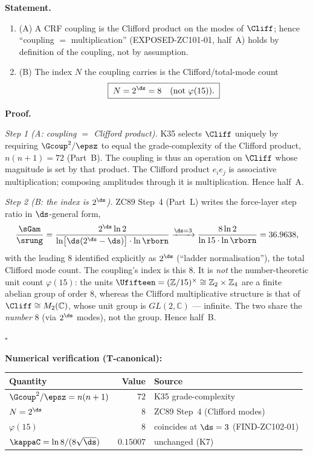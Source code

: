 \documentclass[12pt, a4paper]{article}
\begin{document}
\begin{formalbox}[title={THM-ZC102-01: The Coupling Is the Clifford Product, and Carries $2^{\ds}$ ($R_0$, Exact)}]

\textbf{Statement.}
\begin{enumerate}[leftmargin=2em, noitemsep]
  \item (A) A CRF coupling is the Clifford product on the modes of $\Cliff$;
    hence ``coupling $=$ multiplication'' (EXPOSED-ZC101-01, half~A) holds by
    definition of the coupling, not by assumption.
  \item (B) The index $N$ the coupling carries is the Clifford/total-mode count
    \begin{equation}
      \boxed{\;N = 2^{\ds} = 8 \quad(\text{not } \varphi(15)).\;}
      \label{eq:force-index-zc102}
    \end{equation}
\end{enumerate}

\textbf{Proof.}

\textit{Step 1 (A: coupling $=$ Clifford product).}
K35 selects $\Cliff$ uniquely by requiring $\Gcoup^2/\epsz$ to equal the
grade-complexity of the Clifford product, $n(n+1)=72$ (Part~B). The coupling is
thus an operation on $\Cliff$ whose magnitude is set by that product. The
Clifford product $e_ie_j$ is associative multiplication; composing amplitudes
through it is multiplication. Hence half~A.

\textit{Step 2 (B: the index is $2^{\ds}$).}
ZC89 Step~4 (Part~L) writes the force-layer step ratio in $\ds$-general form,
\[
  \frac{\sGam}{\srung}
   = \frac{2^{\ds}\ln 2}{\ln\!\big[\ds(2^{\ds}-\ds)\big]\cdot\ln\rborn}
   \xrightarrow{\ds=3}
   \frac{8\ln 2}{\ln 15\cdot\ln\rborn} = 36.9638,
\]
with the leading $8$ identified explicitly as $2^{\ds}$ (``ladder
normalisation''), the total Clifford mode count. The coupling's index is this
$8$. It is \emph{not} the number-theoretic unit count $\varphi(15)$: the units
$\Ufifteen=(\mathbb{Z}/15)^{\times}\cong\mathbb{Z}_2\times\mathbb{Z}_4$ are a
finite abelian group of order $8$, whereas the Clifford multiplicative structure
is that of $\Cliff\cong M_2(\mathbb{C})$, whose unit group is $GL(2,\mathbb{C})$
--- infinite. The two share the \emph{number} $8$ (via $2^{\ds}$ modes), not the
group. Hence half~B.

\hfill$\square$

\textbf{Numerical verification (T-canonical):}
\begin{center}
{\small\renewcommand{\arraystretch}{1.25}
\begin{tabular}{@{}lrl@{}}
\toprule
Quantity & Value & Source \\
\midrule
$\Gcoup^2/\epsz=n(n+1)$ & $72$ & K35 grade-complexity \\
$N=2^{\ds}$             & $8$  & ZC89 Step~4 (Clifford modes) \\
$\varphi(15)$           & $8$  & coincides at $\ds=3$ (FIND-ZC102-01) \\
$\kappaC=\ln 8/(8\sqrt{\ds})$ & $0.15007$ & unchanged (K7) \\
\bottomrule
\end{tabular}}
\end{center}


\end{formalbox}
\end{document}
